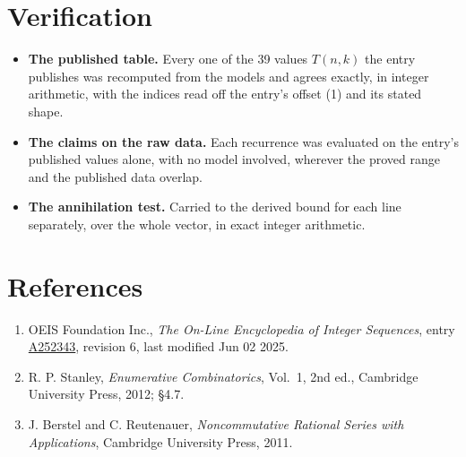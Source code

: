 \documentclass[11pt]{article}
\theoremstyle{definition}
\begin{document}
\section{Verification}

\begin{itemize}

\item {\bfseries The published table.} Every one of the 39 values $T(n,k)$ the entry publishes was recomputed from the models and agrees exactly, in integer arithmetic, with the indices read off the entry's offset (1) and its stated shape.

\item {\bfseries The claims on the raw data.} Each recurrence was evaluated on the entry's published values alone, with no model involved, wherever the proved range and the published data overlap.

\item {\bfseries The annihilation test.} Carried to the derived bound for each line separately, over the whole vector, in exact integer arithmetic.

\end{itemize}

\section{References}

\begin{enumerate}

\item OEIS Foundation Inc., \emph{The On-Line Encyclopedia of Integer Sequences}, entry \href{https://oeis.org/A252343}{A252343}, revision 6, last modified Jun 02 2025.

\item R. P. Stanley, \emph{Enumerative Combinatorics}, Vol.~1, 2nd ed., Cambridge University Press, 2012; \S4.7.

\item J. Berstel and C. Reutenauer, \emph{Noncommutative Rational Series with Applications}, Cambridge University Press, 2011.

\end{enumerate}
\end{document}
